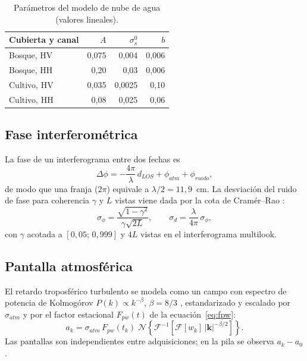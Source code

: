 \documentclass[11pt,a4paper]{article}
\newcommand{\vect}[1]{\mathbf{#1}}
\begin{document}
\begin{table}[htbp]\centering\small
\caption{Parámetros del modelo de nube de agua (valores lineales).}\label{tab:wcm}
\begin{tabular}{@{}lrrr@{}}\toprule Cubierta y canal & $A$ & $\sigma^0_s$ & $b$ \\ \midrule
Bosque, HV & 0{,}075 & 0{,}004 & 0{,}006 \\
Bosque, HH & 0{,}20 & 0{,}03 & 0{,}006 \\
Cultivo, HV & 0{,}035 & 0{,}0025 & 0{,}10 \\
Cultivo, HH & 0{,}08 & 0{,}025 & 0{,}06 \\ \bottomrule
\end{tabular}
\end{table}

\subsection{Fase interferométrica}
La fase de un interferograma entre dos fechas es
\begin{equation}
  \Delta\phi = -\frac{4\pi}{\lambda}\,d_{LOS} + \phi_{atm} + \phi_{ruido},
\end{equation}
de modo que una franja ($2\pi$) equivale a $\lambda/2 = 11{,}9$~cm. La desviación del ruido de fase para
coherencia $\gamma$ y $L$ vistas viene dada por la cota de Cramér--Rao \cite{rodriguez1992}:
\begin{equation}
  \sigma_\phi = \frac{\sqrt{1-\gamma^2}}{\gamma\sqrt{2L}},\qquad \sigma_d = \frac{\lambda}{4\pi}\,\sigma_\phi ,
\end{equation}
con $\gamma$ acotada a $[0{,}05;\,0{,}999]$ y $4L$ vistas en el interferograma multilook.

\subsection{Pantalla atmosférica}
El retardo troposférico turbulento se modela como un campo con espectro de potencia de Kolmogórov
$P(k)\propto k^{-\beta}$, $\beta = 8/3$ \cite{williams1998,hanssen2001}, estandarizado y escalado por
$\sigma_{atm}$ y por el factor estacional $F_{pw}(t)$ de la ecuación~\eqref{eq:fpw}:
\begin{equation}
  a_k = \sigma_{atm}\,F_{pw}(t_k)\;\mathcal N\!\left\{\mathcal F^{-1}\!\left[\mathcal F[w_k]\,|\vect k|^{-\beta/2}\right]\right\}.
\end{equation}
Las pantallas son independientes entre adquisiciones; en la pila se observa $a_k - a_0$.
\end{document}
